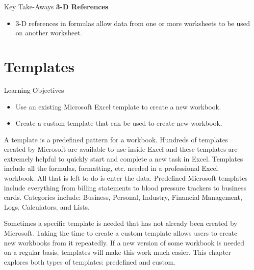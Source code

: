 \begin{center}
	\begin{tkwbox}{Key Take-Aways}
		\textbf{3-D References}
		\\
		\begin{itemize}
			\setlength{\itemsep}{0pt}
			\setlength{\parskip}{0pt}
			\setlength{\parsep}{0pt}
			
			\item $ 3 $-D references in formulas allow data from one or more worksheets to be used on another worksheet.
			
		\end{itemize}
	\end{tkwbox}
\end{center}

\section{Templates}

\begin{center}
	\begin{objbox}{Learning Objectives}
		\begin{itemize}
			\setlength{\itemsep}{0pt}
			\setlength{\parskip}{0pt}
			\setlength{\parsep}{0pt}

			\item Use an existing Microsoft Excel template to create a new workbook.
			\item Create a custom template that can be used to create new workbook.
		
		\end{itemize}
	\end{objbox}
\end{center}

A template is a predefined pattern for a workbook. Hundreds of templates created by Microsoft are available to use inside Excel and these templates are extremely helpful to quickly start and complete a new task in Excel. Templates include all the formulas, formatting, etc. needed in a professional Excel workbook. All that is left to do is enter the data. Predefined Microsoft templates include everything from billing statements to blood pressure trackers to business cards. Categories include: Business, Personal, Industry, Financial Management, Logs, Calculators, and Lists.

Sometimes a specific template is needed that has not already been created by Microsoft. Taking the time to create a custom template allows users to create new workbooks from it repeatedly. If a new version of some workbook is needed on a regular basis, templates will make this work much easier. This chapter explores both types of templates: predefined and custom.

